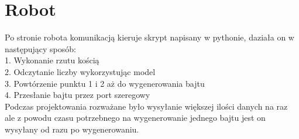 \section{Robot}\label{sec:robot}
    Po stronie robota komunikacją kieruje skrypt napisany w pythonie, daziała on w następujący sposób:
    \\1. Wykonanie rzutu kością
    \\2. Odczytanie liczby wykorzystując model
    \\3. Powtórzenie punktu 1 i 2 aż do wygenerowania bajtu
    \\4. Przesłanie bajtu przez port szeregowy \\

    Podczas projektowania rozważane było wysyłanie większej ilości danych na raz 
    ale z powodu czasu potrzebnego na wygenerowanie jednego bajtu jest on wysyłany od razu po wygenerowaniu.